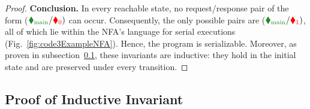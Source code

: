 \begin{proof}
	\medskip
	\noindent\textbf{Conclusion.}
	In every reachable state, no request/response pair of the form
	($	\text{\color{ForestGreen}$\blacklozenge_{\text{main}}$}/\text{\color{red}$\blacklozenge_{0}$})
	$
	can occur. Consequently, the only possible pairs are
	($	\text{\color{ForestGreen}$\blacklozenge_{\text{main}}$}/\text{\color{red}$\blacklozenge_{1}$})
	$,
	all of which lie within the NFA’s language for serial executions (Fig.~\ref{fig:code3ExampleNFA}).
	Hence, the program is serializable. Moreover, as proven in subsection~\ref{appendix:subsec:InductiveInvariantExample},
	these invariants are inductive: they hold in the initial state and are preserved under every transition.
\end{proof}







%


\subsection{Proof of Inductive Invariant}
\label{appendix:subsec:InductiveInvariantExample}


